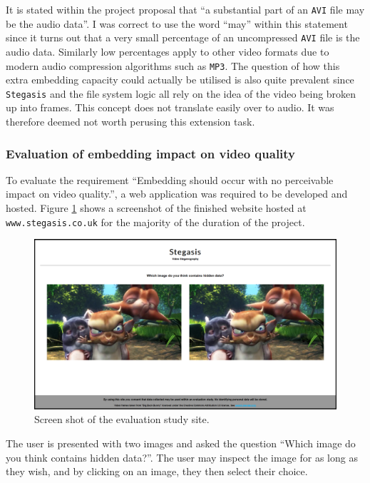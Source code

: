 \documentclass[paper=a4, fontsize=11pt,twoside]{scrartcl}
\numberwithin{table}{section}
\numberwithin{figure}{section}
\numberwithin{algorithm}{section}
\begin{document}
It is stated within the project proposal that ``a substantial part of an \texttt{AVI} file may be the audio data''. I was correct to use the word ``may'' within this statement since it turns out that a very small percentage of an uncompressed \texttt{AVI} file is the audio data. Similarly low percentages apply to other video formats due to modern audio compression algorithms such as \texttt{MP3}. The question of how this extra embedding capacity could actually be utilised is also quite prevalent since \texttt{Stegasis} and the file system logic all rely on the idea of the video being broken up into frames. This concept does not translate easily over to audio. It was therefore deemed not worth perusing this extension task. 

\subsubsection{Evaluation of embedding impact on video quality}

To evaluate the requirement ``Embedding should occur with no perceivable impact on video quality.'', a web application was required to be developed and hosted. Figure \ref{site} shows a screenshot of the finished website hosted at \texttt{www.stegasis.co.uk} for the majority of the duration of the project.

\begin{figure}[!h]
\centerline{\includegraphics[width=\textwidth]{images/site.png}}
\caption{Screen shot of the evaluation study site.}
\label{site}
\end{figure}

The user is presented with two images and asked the question ``Which image do you think contains hidden data?''. The user may inspect the image for as long as they wish, and by clicking on an image, they then select their choice.
\end{document}
